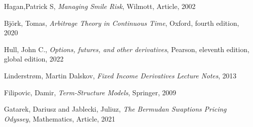\clearpage
{}

\begin{thebibliography}{25}
Hagan,Patrick S, \emph{Managing Smile Risk},
Wilmott, Article, 2002


Björk, Tomas,
\emph{Arbitrage Theory in Continuous Time},
 Oxford, fourth edition, 2020

Hull, John C., 
\emph{Options, futures, and other derivatives},
Pearson, eleventh edition, global edition, 2022

Linderstrøm, Martin Dalskov, 
\emph{Fixed Income Derivatives Lecture Notes},
2013

Filipovic, Damir, \emph{Term-Structure Models}, 
Springer, 2009

Gatarek, Dariusz and Jablecki, Juliuz, \emph{The Bermudan Swaptions Pricing Odyssey},
Mathematics, Article, 2021



\end{thebibliography}

